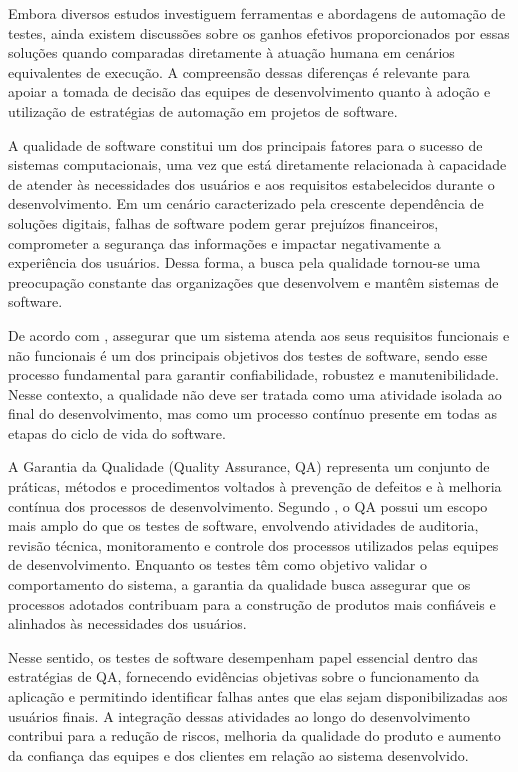 \documentclass{UNESC}
\begin{document}
Embora diversos estudos investiguem ferramentas e abordagens de automação de testes, ainda existem discussões sobre os ganhos efetivos proporcionados por essas soluções quando comparadas diretamente à atuação humana em cenários equivalentes de execução. A compreensão dessas diferenças é relevante para apoiar a tomada de decisão das equipes de desenvolvimento quanto à adoção e utilização de estratégias de automação em projetos de software.

A qualidade de software constitui um dos principais fatores para o sucesso de sistemas computacionais, uma vez que está diretamente relacionada à capacidade de atender às necessidades dos usuários e aos requisitos estabelecidos durante o desenvolvimento. Em um cenário caracterizado pela crescente dependência de soluções digitais, falhas de software podem gerar prejuízos financeiros, comprometer a segurança das informações e impactar negativamente a experiência dos usuários. Dessa forma, a busca pela qualidade tornou-se uma preocupação constante das organizações que desenvolvem e mantêm sistemas de software.

De acordo com , assegurar que um sistema atenda aos seus requisitos funcionais e não funcionais é um dos principais objetivos dos testes de software, sendo esse processo fundamental para garantir confiabilidade, robustez e manutenibilidade. Nesse contexto, a qualidade não deve ser tratada como uma atividade isolada ao final do desenvolvimento, mas como um processo contínuo presente em todas as etapas do ciclo de vida do software.

A Garantia da Qualidade (Quality Assurance, QA) representa um conjunto de práticas, métodos e procedimentos voltados à prevenção de defeitos e à melhoria contínua dos processos de desenvolvimento. Segundo , o QA possui um escopo mais amplo do que os testes de software, envolvendo atividades de auditoria, revisão técnica, monitoramento e controle dos processos utilizados pelas equipes de desenvolvimento. Enquanto os testes têm como objetivo validar o comportamento do sistema, a garantia da qualidade busca assegurar que os processos adotados contribuam para a construção de produtos mais confiáveis e alinhados às necessidades dos usuários.

Nesse sentido, os testes de software desempenham papel essencial dentro das estratégias de QA, fornecendo evidências objetivas sobre o funcionamento da aplicação e permitindo identificar falhas antes que elas sejam disponibilizadas aos usuários finais. A integração dessas atividades ao longo do desenvolvimento contribui para a redução de riscos, melhoria da qualidade do produto e aumento da confiança das equipes e dos clientes em relação ao sistema desenvolvido.
\end{document}

